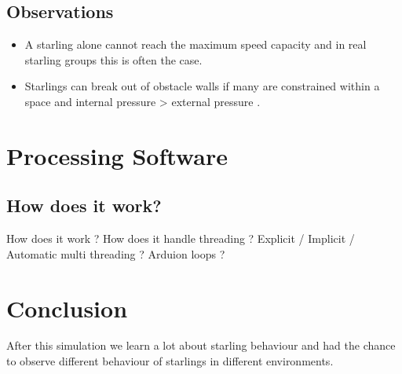 \documentclass[12pt]{report}
\begin{document}
\section{Observations}

\begin{itemize}
  \item A starling alone cannot reach the maximum speed capacity and in real starling groups this is often the case.
  \item Starlings can break out of obstacle walls if many are constrained within a space and internal pressure > external pressure .
\end{itemize}

\chapter{Processing Software}
\section{How does it work?}
How does it work ? How does it handle threading ?
Explicit / Implicit / Automatic multi threading ? Arduion loops ?

\chapter{Conclusion}
After this simulation we learn a lot about starling behaviour and had the chance to observe different behaviour of starlings in different environments.






\end{document}
